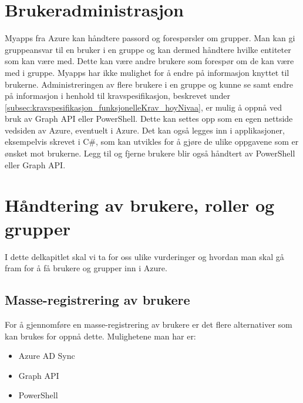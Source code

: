 \section{Brukeradministrasjon}
\label{sec:konfigurasjon_brukeradministrasjon}
Myapps fra Azure kan håndtere passord og forespørsler om grupper. Man kan gi gruppeansvar til en bruker i en gruppe og kan dermed håndtere hvilke entiteter som kan være med. Dette kan være andre brukere som forespør om de kan være med i gruppe. Myapps har ikke mulighet for å endre på informasjon knyttet til brukerne. Administreringen av flere brukere i en gruppe og kunne se samt endre på informasjon i henhold til kravspesifikasjon, beskrevet under \ref{subsec:kravspesifikasjon_funksjonelleKrav_hoyNivaa}, er mulig å oppnå ved bruk av Graph API eller PowerShell. Dette kan settes opp som en egen nettside vedsiden av Azure, eventuelt i Azure. Det kan også legges inn i applikasjoner, eksempelvis skrevet i C\#, som kan utvikles for å gjøre de ulike oppgavene som er ønsket mot brukerne. Legg til og fjerne brukere blir også håndtert av PowerShell eller Graph API. 

\section{Håndtering av brukere, roller og grupper}
\label{sec:konfigurasjon_handteringAvRollerOgGrupper}
I dette delkapitlet skal vi ta for oss ulike vurderinger og hvordan man skal gå fram for å få brukere og grupper inn i Azure.

\subsection{Masse-registrering av brukere}
\label{subsec:konfigurasjon_handteringAvRollerOgGrupper_masseRegistrering}
For å gjennomføre en masse-registrering av brukere er det flere alternativer som kan brukes for oppnå dette. Mulighetene man har er:
\begin{itemize}
\item Azure AD Sync
\item Graph API
\item PowerShell
\end{itemize}

